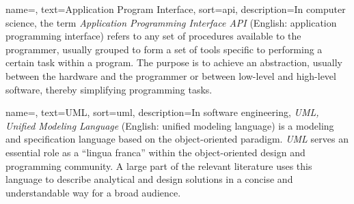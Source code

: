 

 {
    name=,
    text=Application Program Interface,
    sort=api,
    description={In computer science, the term \emph{Application Programming Interface API} (English: application programming interface) refers to any set of procedures available to the programmer, usually grouped to form a set of tools specific to performing a certain task within a program. The purpose is to achieve an abstraction, usually between the hardware and the programmer or between low-level and high-level software, thereby simplifying programming tasks.}
}

 {
    name=,
    text=UML,
    sort=uml,
    description={In software engineering, \emph{UML, Unified Modeling Language} (English: unified modeling language) is a modeling and specification language based on the object-oriented paradigm. \emph{UML} serves an essential role as a “lingua franca” within the object-oriented design and programming community. A large part of the relevant literature uses this language to describe analytical and design solutions in a concise and understandable way for a broad audience.}
}